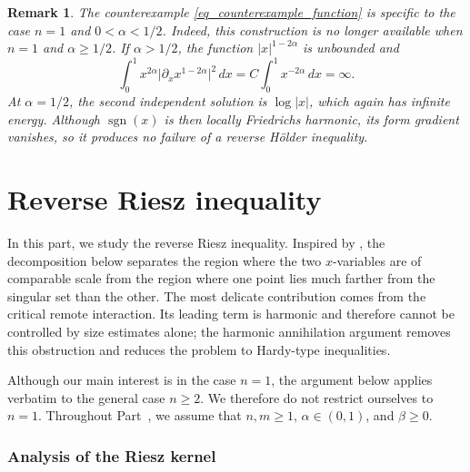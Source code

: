 \documentclass[12pt]{amsart}
\newtheorem{remark}[theorem]{Remark}
\begin{document}
\begin{remark}\label{rem_counterexample_other_regimes}
The counterexample \eqref{eq_counterexample_function} is specific to the case $n=1$ and $0<\alpha<1/2$. Indeed, this construction is no longer available when $n=1$ and $\alpha\ge 1/2$. If
$\alpha>1/2$, the function $|x|^{1-2\alpha}$ is unbounded and
\begin{equation*}
\int_0^1
x^{2\alpha}
\bigl|
\partial_x x^{1-2\alpha}
\bigr|^2 \, dx
=
C\int_0^1x^{-2\alpha}\,dx
=
\infty.
\end{equation*}
At $\alpha=1/2$, the second independent solution is $\log|x|$, which again has
infinite energy. Although $\operatorname{sgn}(x)$ is then locally Friedrichs harmonic,
its form gradient vanishes, so it produces no failure of a reverse H\"older inequality. 
\end{remark}












\part{Reverse Riesz inequality}\label{part3}




In this part, we study the reverse Riesz inequality. Inspired by \cite{Gilles}, the decomposition below separates the region where the two $x$-variables are of comparable scale from the region where one point lies much farther from the singular set than the other. The most delicate contribution comes from the critical remote interaction. Its leading term is harmonic and therefore cannot be controlled by size estimates alone; the harmonic annihilation argument removes this obstruction and reduces the problem to Hardy-type inequalities.

Although our main interest is in the case $n=1$, the argument below applies verbatim to the general case $n\ge 2$. We therefore do not restrict ourselves to $n=1$. Throughout Part~\ref{part3}, we assume that $n,m\ge 1$, $\alpha\in(0,1)$, and $\beta\ge 0$.

\section{Analysis of the Riesz kernel}
\end{document}

